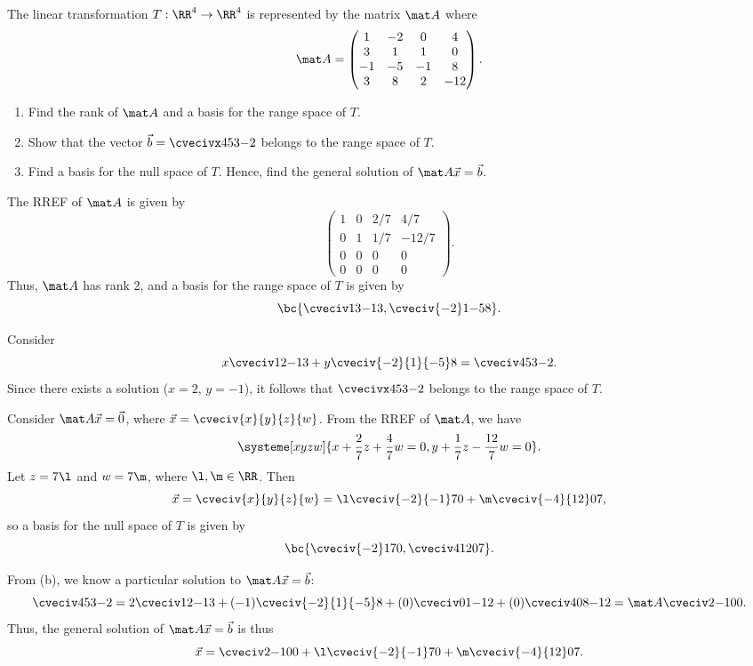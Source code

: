 \clearpage
\begin{problem}
    The linear transformation $T : \RR^4 \to \RR^4$ is represented by the matrix $\mat A$ where \[\mat A = \begin{pmatrix}1 & -2 & 0 & 4 \\ 3 & 1 & 1 & 0 \\ -1 & -5 & -1 & 8 \\ 3 & 8 & 2 & -12\end{pmatrix}.\]
    
    \begin{enumerate}
        \item Find the rank of $\mat A$ and a basis for the range space of $T$.
        \item Show that the vector $\vec b = \cvecivx453{-2}$ belongs to the range space of $T$.
        \item Find a basis for the null space of $T$. Hence, find the general solution of $\mat A \vec x = \vec b$.
    \end{enumerate}
\end{problem}
\begin{solution}
    \begin{ppart}
        The RREF of $\mat A$ is given by \[\begin{pmatrix}1 & 0 & 2/7 & 4/7 \\ 0 & 1 & 1/7 & -12/7 \\ 0 & 0 & 0 & 0 \\ 0 & 0 & 0 & 0\end{pmatrix}.\] Thus, $\mat A$ has rank 2, and a basis for the range space of $T$ is given by \[\bc{\cveciv13{-1}3, \cveciv{-2}1{-5}8}.\]
    \end{ppart}
    \begin{ppart}
        Consider \[x \cveciv12{-1}3 + y \cveciv{-2}{1}{-5}8 = \cveciv453{-2}.\] Since there exists a solution ($x = 2$, $y = -1$), it follows that $\cvecivx453{-2}$ belongs to the range space of $T$.
    \end{ppart}
    \begin{ppart}
        Consider $\mat A \vec x = \vec 0$, where $\vec x = \cveciv{x}{y}{z}{w}$. From the RREF of $\mat A$, we have \[\systeme[xyzw]{x + \frac27z + \frac47w = 0, y + \frac17z - \frac{12}{7} w = 0}.\] Let $z = 7\l$ and $w = 7\m$, where $\l, \m \in \RR$. Then \[\vec x = \cveciv{x}{y}{z}{w} = \l \cveciv{-2}{-1}70 + \m \cveciv{-4}{12}07,\] so a basis for the null space of $T$ is given by \[\bc{\cveciv{-2}170, \cveciv4{12}07}.\]
        
        From (b), we know a particular solution to $\mat A \vec x = \vec b$: \[\cveciv453{-2} = 2 \cveciv12{-1}3 + (-1) \cveciv{-2}{1}{-5}8 + (0)\cveciv01{-1}2 + (0)\cveciv408{-12} = \mat A \cveciv2{-1}00.\] Thus, the general solution of $\mat A \vec x = \vec b$ is thus \[\vec x = \cveciv2{-1}00 + \l \cveciv{-2}{-1}70 + \m \cveciv{-4}{12}07.\]
    \end{ppart}
\end{solution}

